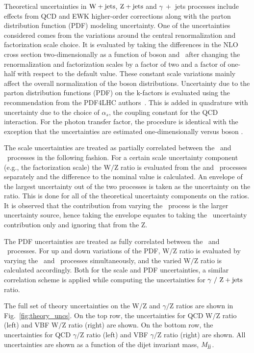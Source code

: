 Theoretical uncertainties in $\mathrm{W}+\textrm{jets}$, $\mathrm{Z}+\textrm{jets}$ and $\gamma \ +$ jets processes include effects from QCD and EWK higher-order
corrections along with the parton distribution function (PDF) modeling uncertainty. One of the uncertainties considered comes from the
variations around the central renormalization and factorization scale choice. It is evaluated by taking the differences in the NLO cross
section two-dimensionally as a function of boson \pt and \mjj~after changing the renormalization and factorization scales by a factor of two 
and a factor of one-half with respect to the default value. These constant scale variations mainly affect the
overall normalization of the boson \pt distributions. 
Uncertainty due to the parton distribution functions (PDF) on the k-factors
is evaluated using the recommendation from the PDF4LHC authors~\cite{paper:PDF4LHC}. 
This is added in quadrature with uncertainty due to the choice of $\alpha_{s}$, the coupling constant for the QCD interaction.
For the photon transfer factor, the procedure is identical with the exception that the uncertainties are estimated one-dimensionally versus boson \pt{}.

The scale uncertainties are treated as partially correlated between the \Zjets~and \Wjets~processes in the following fashion. 
For a certain scale uncertainty component (e.g., the factorization scale) the W$/$Z ratio is evaluated from the \Zjets{} and \Wjets~processes 
separately and the difference to the nominal value is calculated.
An envelope of the largest uncertainty out of the two processes is taken as the uncertainty on the ratio.
This is done for all of the theoretical uncertainty components on the ratios.
It is observed that the contribution from varying the \Wjets~process is the larger uncertainty source,
hence taking the envelope equates to taking the \Wjets~uncertainty contribution only and ignoring that from the Z.

The PDF uncertainties are treated as fully correlated between the \Zjets~and \Wjets~processes. For up and down variations of the PDF, W$/$Z ratio is 
evaluated by varying the \Wjets~and \Zjets~processes simultaneously, and the varied W$/$Z ratio is calculated accordingly. 
Both for the scale and PDF uncertainties, a similar correlation scheme is applied while computing the uncertainties for $\gamma~/~\mathrm{Z}+\textrm{jets}$ ratio.

The full set of theory uncertainties on the W$/$Z and $\gamma/$Z ratios are shown in Fig.~\ref{fig:theory_uncs}. On the top row,
the uncertainties for QCD W$/$Z ratio (left) and VBF W$/$Z ratio (right) are shown. On the bottom row,
the uncertainties for QCD $\gamma/$Z ratio (left) and VBF $\gamma/$Z ratio (right) are shown. All uncertainties are shown as a function
of the dijet invariant mass, $M_{\textrm{jj}}$. 

